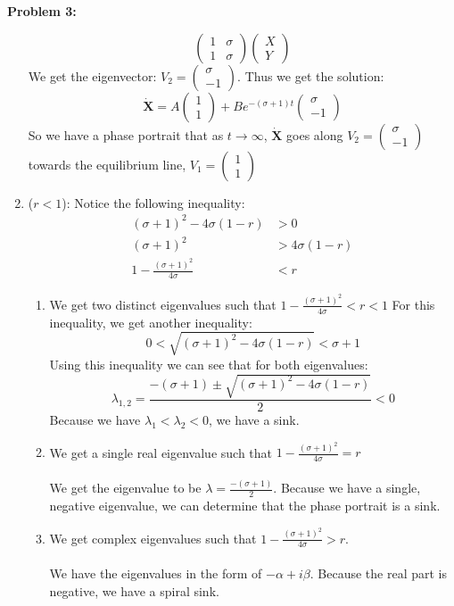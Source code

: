 \documentclass[11pt]{article}
\newenvironment{problem}[1]{\textbf{Problem #1: }}{\newpage}
\begin{document}
\begin{problem}{3}
\begin{enumerate}[label = (\alph*)]
\[\begin{pmatrix}
			1 & \sigma \\
			1 & \sigma
			\end{pmatrix}\begin{pmatrix}
			X \\ Y
			\end{pmatrix}\]
			We get the eigenvector: $V_2 = \begin{pmatrix}
			\sigma \\ -1
			\end{pmatrix}.$
			Thus we get the solution:
			\[\boldsymbol{\dot{X}} = A\begin{pmatrix}
			1 \\ 1
			\end{pmatrix} + Be^{-(\sigma + 1)t}\begin{pmatrix}
			\sigma \\ -1
			\end{pmatrix}\]
			So we have a phase portrait that as $t \rightarrow \infty$, $\boldsymbol{\dot{X}}$ goes along $V_2 = \begin{pmatrix}
			\sigma \\ -1
			\end{pmatrix}$ towards the equilibrium line, $V_1 = \begin{pmatrix}
			1 \\ 1
			\end{pmatrix}$
			\item ($r < 1$):
			Notice the following inequality:
			\begin{align*}
				(\sigma + 1)^2 - 4\sigma(1-r) &> 0 \\
				(\sigma + 1)^2 &> 4\sigma(1-r) \\
				1 - \frac{(\sigma + 1)^2}{4\sigma} &< r
			\end{align*}
			\begin{enumerate}[label = (\alph*)]
				\item We get two distinct eigenvalues such that $1 - \frac{(\sigma + 1)^2}{4\sigma} < r < 1$
				For this inequality, we get another inequality:
				\[0 < \sqrt{(\sigma + 1)^2 - 4\sigma(1-r)} < \sigma + 1\]	
				Using this inequality we can see that for both eigenvalues:
				\[\lambda_{1,2} = \frac{-(\sigma + 1) \pm \sqrt{(\sigma + 1)^2 - 4\sigma(1-r)} }{2} < 0\]
				Because we have $\lambda_1 < \lambda_2 < 0$, we have a sink.	
				\item We get a single real eigenvalue such that $1 - \frac{(\sigma + 1)^2}{4\sigma} = r$ 
				\\ \\
				We get the eigenvalue to be $\lambda = \frac{-(\sigma + 1)}{2}$.  Because we have a single, negative eigenvalue, we can determine that the phase portrait is a sink.
				\item 	We get complex eigenvalues such that $1 - \frac{(\sigma + 1)^2}{4\sigma} > r$.
				\\ \\
				We have the eigenvalues in the form of $-\alpha + i\beta$.  Because the real part is negative, we have a spiral sink.
			\end{enumerate}
				

\end{enumerate}
\end{problem}
\end{document}
